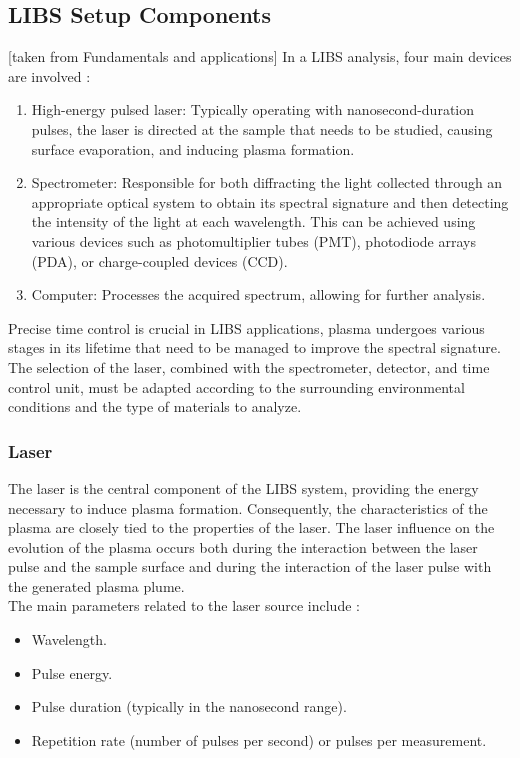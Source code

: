 \subsection{LIBS Setup Components}
\label{subsec:libs_setup_component}
[taken from Fundamentals and applications]
In a LIBS analysis, four main devices are involved \cite{singhPreface2007}:
\begin{enumerate}
    \item High-energy pulsed laser: Typically operating with nanosecond-duration pulses, the laser is directed at the sample that needs to be studied, causing surface evaporation, and inducing plasma formation.
    \item Spectrometer: Responsible for both diffracting the light collected through an appropriate optical system to obtain its spectral signature and then detecting the intensity of the light at each wavelength. This can be achieved using various devices such as photomultiplier tubes (PMT), photodiode arrays (PDA), or charge-coupled devices (CCD). 
    \item Computer: Processes the acquired spectrum, allowing for further analysis.
\end{enumerate}

Precise time control is crucial in LIBS applications, plasma undergoes various stages in its lifetime that need to be managed to improve the spectral signature.
\\
The selection of the laser, combined with the spectrometer, detector, and time control unit, must be adapted according to the surrounding environmental conditions and the type of materials to analyze.

\subsubsection{Laser}
\label{subsubsec:laser_setup_component}
The laser is the central component of the LIBS system, providing the energy necessary to induce plasma formation. Consequently, the characteristics of the plasma are closely tied to the properties of the laser. The laser influence on the evolution of the plasma occurs both during the interaction between the laser pulse and the sample surface and during the interaction of the laser pulse with the generated plasma plume.
\\
The main parameters related to the laser source include \cite{anabitarteLaserInducedBreakdownSpectroscopy2012}:
\begin{itemize}
    \item Wavelength.
    \item Pulse energy.
    \item Pulse duration (typically in the nanosecond range).
    \item Repetition rate (number of pulses per second) or pulses per measurement.    
\end{itemize}

